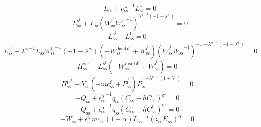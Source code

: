 \begin{equation}
-L_\mathrm{ss} + {\nu^{\mathrm{w}}_\mathrm{ss}}^{-1} {L^{\mathrm{s}}_\mathrm{ss}} = 0
\end{equation}
\begin{equation}
-L^{\mathrm{s}^{\mathrm{f}}}_\mathrm{ss} + {L^{\mathrm{f}}_\mathrm{ss}} {\left({W^{\mathrm{i}^{\mathrm{f}}}_\mathrm{ss}} {W^{\mathrm{f}}_\mathrm{ss}}^{-1}\right)^{{\lambda^{\mathrm{w}}}^{-1} \left(-1 - \lambda^{\mathrm{w}}\right)}} = 0
\end{equation}
\begin{equation}
L^{\mathrm{s}^{\mathrm{f}}}_\mathrm{ss} - L^{\mathrm{f}}_\mathrm{ss} = 0
\end{equation}
\begin{equation}
L^{\mathrm{s}^{\mathrm{f}}}_\mathrm{ss} + {\lambda^{\mathrm{w}}}^{-1} {L^{\mathrm{f}}_\mathrm{ss}} {W^{\mathrm{f}}_\mathrm{ss}}^{-1} \left(-1 - \lambda^{\mathrm{w}}\right) \left(-W^{\mathrm{disutil}^{\mathrm{f}}}_\mathrm{ss} + W^{\mathrm{i}^{\mathrm{f}}}_\mathrm{ss}\right) {\left({W^{\mathrm{i}^{\mathrm{f}}}_\mathrm{ss}} {W^{\mathrm{f}}_\mathrm{ss}}^{-1}\right)^{-1 + {\lambda^{\mathrm{w}}}^{-1} \left(-1 - \lambda^{\mathrm{w}}\right)}} = 0
\end{equation}
\begin{equation}
\Pi^{\mathrm{ws}^{\mathrm{f}}}_\mathrm{ss} - {L^{\mathrm{s}^{\mathrm{f}}}_\mathrm{ss}} \left(-W^{\mathrm{disutil}^{\mathrm{f}}}_\mathrm{ss} + W^{\mathrm{i}^{\mathrm{f}}}_\mathrm{ss}\right) = 0
\end{equation}
\begin{equation}
\Pi^{\mathrm{ps}^{\mathrm{f}}}_\mathrm{ss} - {Y^{\mathrm{f}}_\mathrm{ss}} \left(-{m\!c}^{\mathrm{f}}_\mathrm{ss} + P^{\mathrm{j}^{\mathrm{f}}}_\mathrm{ss}\right) {{P^{\mathrm{j}^{\mathrm{f}}}_\mathrm{ss}}^{-{\lambda^{\mathrm{p}}}^{-1} \left(1 + \lambda^{\mathrm{p}}\right)}} = 0
\end{equation}
\begin{equation}
-Q_\mathrm{ss} + {\epsilon^{\mathrm{b}}_\mathrm{ss}}^{-1} {q_\mathrm{ss}} {\left(C_\mathrm{ss} - {h} {C_\mathrm{ss}}\right)^{\sigma^{\mathrm{c}}}} = 0
\end{equation}
\begin{equation}
-Q^{\mathrm{f}}_\mathrm{ss} + {\epsilon^{\mathrm{b}}_\mathrm{ss}}^{-1} {q^{\mathrm{f}}_\mathrm{ss}} {\left(C^{\mathrm{f}}_\mathrm{ss} - {h} {C^{\mathrm{f}}_\mathrm{ss}}\right)^{\sigma^{\mathrm{c}}}} = 0
\end{equation}
\begin{equation}
-W_\mathrm{ss} + {\epsilon^{\mathrm{a}}_\mathrm{ss}} {{m\!c}_\mathrm{ss}} \left(1 - \alpha\right) {{L_\mathrm{ss}}^{-\alpha}} {\left({z_\mathrm{ss}} {K_\mathrm{ss}}\right)^{\alpha}} = 0
\end{equation}
